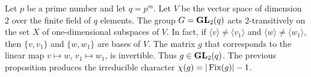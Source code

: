 %
\begin{example}
    Let $p$ be a prime number and let $q=p^{m}$. Let $V$ 
    be the vector space of dimension $2$ 
    over the finite field of $q$ elements. 
    The group $G=\mathbf{GL}_2(q)$ acts 2-transitively on the set $X$ of
    one-dimensional subspaces of $V$. In fact, 
    if $\langle v\rangle\ne\langle v_1\rangle$ and $\langle w\rangle\ne\langle w_1\rangle$, 
    then $\{v,v_1\}$ and $\{w,w_1\}$ are bases of $V$. 
    The matrix $g$ that corresponds to the linear map 
    $v\mapsto w$, $v_1\mapsto w_1$, is invertible. Thus $g\in\mathbf{GL}_2(q)$. 
    The previous proposition produces the irreducible character
    $\chi(g)=|\operatorname{Fix}(g)|-1$. 
\end{example}

